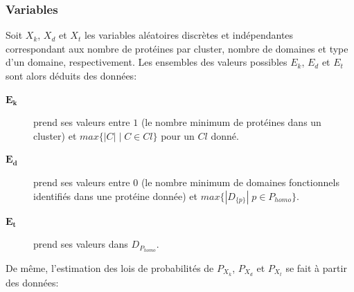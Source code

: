 \subsubsection{Variables}
Soit $X_{k}$, $X_{d}$ et $X_{t}$ les variables aléatoires discrètes et indépendantes correspondant aux nombre de protéines par cluster, nombre de domaines et type d'un domaine, respectivement. Les ensembles des valeurs possibles $E_{k}$, $E_{d}$ et $E_{t}$ sont alors déduits des données:
	\begin{description}
		\item[$\mathbf{E_{k}}$] prend ses valeurs entre $1$ (le nombre minimum de protéines dans un cluster) et $max\{|C|\;|\; C \in Cl\}$ pour un $Cl$ donné.
		\item[$\mathbf{E_{d}}$] prend ses valeurs entre $0$ (le nombre minimum de domaines fonctionnels identifiés dans une protéine donnée) et $max\{|D_{\{p\}}|\; p \in P_{homo}\}$.
		\item[$\mathbf{E_{t}}$] prend ses valeurs dans $D_{P_{homo}}$.
	\end{description}	    
De même, l'estimation des lois de probabilités de $P_{X_{k}}$, $P_{X_{d}}$ et $P_{X_{t}}$ se fait à partir des données:
